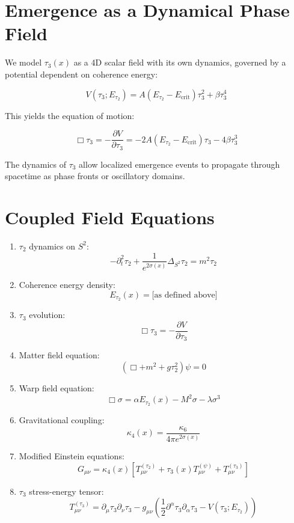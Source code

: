 \documentclass[12pt]{article}
\begin{document}
\section{Emergence as a Dynamical Phase Field}

We model $\tau_3(x)$ as a 4D scalar field with its own dynamics, governed by a potential dependent on coherence energy:

\[
V(\tau_3; E_{\tau_2}) = A (E_{\tau_2} - E_{\text{crit}}) \tau_3^2 + \beta \tau_3^4
\]

This yields the equation of motion:

\[
\Box \tau_3 = -\frac{\partial V}{\partial \tau_3} = -2A(E_{\tau_2} - E_{\text{crit}})\tau_3 - 4\beta \tau_3^3
\]

The dynamics of $\tau_3$ allow localized emergence events to propagate through spacetime as phase fronts or oscillatory domains.

\section{Coupled Field Equations}

\begin{enumerate}
    \item $\tau_2$ dynamics on $S^2$:
    \[
    -\partial_t^2 \tau_2 + \frac{1}{e^{2\sigma(x)}} \Delta_{S^2} \tau_2 = m^2 \tau_2
    \]
    \item Coherence energy density:
    \[
    E_{\tau_2}(x) = \text{[as defined above]}
    \]
    \item $\tau_3$ evolution:
    \[
    \Box \tau_3 = -\frac{\partial V}{\partial \tau_3}
    \]
    \item Matter field equation:
    \[
    \left( \Box + m^2 + g \tau_2^2 \right)\psi = 0
    \]
    \item Warp field equation:
    \[
    \Box \sigma = \alpha E_{\tau_2}(x) - M^2 \sigma - \lambda \sigma^3
    \]
    \item Gravitational coupling:
    \[
    \kappa_4(x) = \frac{\kappa_6}{4\pi e^{2\sigma(x)}}
    \]
    \item Modified Einstein equations:
    \[
    G_{\mu\nu} = \kappa_4(x) \left[
    T_{\mu\nu}^{(\tau_2)} +
    \tau_3(x) T_{\mu\nu}^{(\psi)} +
    T_{\mu\nu}^{(\tau_3)}
    \right]
    \]
    \item $\tau_3$ stress-energy tensor:
    \[
    T_{\mu\nu}^{(\tau_3)} = \partial_\mu \tau_3 \partial_\nu \tau_3 -
    g_{\mu\nu} \left( \frac{1}{2} \partial^\alpha \tau_3 \partial_\alpha \tau_3 - V(\tau_3; E_{\tau_2}) \right)
    \]
\end{enumerate}
\end{document}
